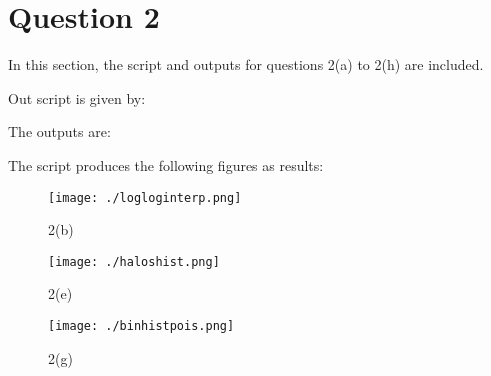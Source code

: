 \section{Question 2}

In this section, the script and outputs for questions 2(a) to 2(h) are included.

Out script is given by:


The outputs are:


The script produces the following figures as results:

\begin{figure}[h!]
  \centering
  \texttt{[image: ./logloginterp.png]}
  \caption{2(b)}
  \label{fig:fig1}
\end{figure}

\begin{figure}[h!]
  \centering
  \texttt{[image: ./haloshist.png]}
  \caption{2(e)}
  \label{fig:fig2}
\end{figure}
\pagebreak

\begin{figure}[h!]
  \centering
  \texttt{[image: ./binhistpois.png]}
  \caption{2(g)}
  \label{fig:fig2}
\end{figure}
